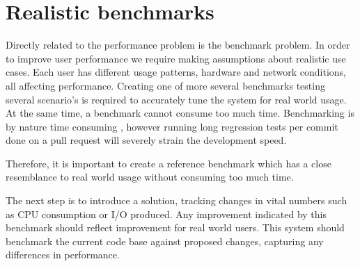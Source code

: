
\section{Realistic benchmarks}
Directly related to the performance problem is the benchmark problem.
In order to improve user performance we require making assumptions about realistic use cases.
Each user has different usage patterns, hardware and network conditions, all affecting performance.
Creating one of more several benchmarks testing several scenario's is required to accurately tune the system for real world usage.
At the same time, a benchmark cannot consume too much time.
Benchmarking is by nature time consuming \cite{huang2014performance}, however running long regression tests per commit done on a pull request will severely strain the development speed.

Therefore, it is important to create a reference benchmark which has a close resemblance to real world usage without consuming too much time.

The next step is to introduce a solution, tracking changes in vital numbers such as CPU consumption or I/O produced.
Any improvement indicated by this benchmark should reflect improvement for real world users.
This system should benchmark the current code base against proposed changes, capturing any differences in performance.



